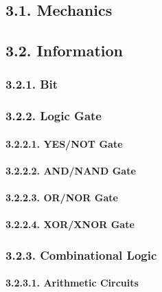 \documentclass[
]{article}
\begin{document}
\hypertarget{mechanics-1}{%
\subsection{3.1. Mechanics}\label{mechanics-1}}

\hypertarget{information-1}{%
\subsection{3.2. Information}\label{information-1}}

\hypertarget{bit-1}{%
\subsubsection{3.2.1. Bit}\label{bit-1}}

\hypertarget{logic-gate-1}{%
\subsubsection{3.2.2. Logic Gate}\label{logic-gate-1}}

\hypertarget{yesnot-gate-1}{%
\paragraph{3.2.2.1. YES/NOT Gate}\label{yesnot-gate-1}}

\hypertarget{andnand-gate-1}{%
\paragraph{3.2.2.2. AND/NAND Gate}\label{andnand-gate-1}}

\hypertarget{ornor-gate-1}{%
\paragraph{3.2.2.3. OR/NOR Gate}\label{ornor-gate-1}}

\hypertarget{xorxnor-gate-1}{%
\paragraph{3.2.2.4. XOR/XNOR Gate}\label{xorxnor-gate-1}}

\hypertarget{combinational-logic-1}{%
\subsubsection{3.2.3. Combinational Logic}\label{combinational-logic-1}}

\hypertarget{arithmetic-circuits-1}{%
\paragraph{3.2.3.1. Arithmetic Circuits}\label{arithmetic-circuits-1}}
\end{document}
